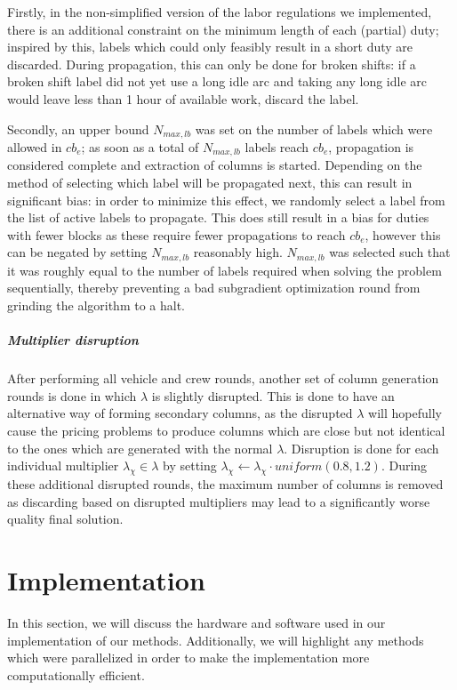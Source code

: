 \documentclass[]{article}
\begin{document}
Firstly, in the non-simplified version of the labor regulations we implemented, there is an additional constraint on the minimum length of each (partial) duty; inspired by this, labels which could only feasibly result in a short duty are discarded. During propagation, this can only be done for broken shifts: if a broken shift label did not yet use a long idle arc and taking any long idle arc would leave less than 1 hour of available work, discard the label.

Secondly, an upper bound $N_{max,lb}$ was set on the number of labels which were allowed in $cb_e$; as soon as a total of $N_{max,lb}$ labels reach $cb_e$, propagation is considered complete and extraction of columns is started. Depending on the method of selecting which label will be propagated next, this can result in significant bias: in order to minimize this effect, we randomly select a label from the list of active labels to propagate. This does still result in a bias for duties with fewer blocks as these require fewer propagations to reach $cb_e$, however this can be negated by setting $N_{max,lb}$ reasonably high. $N_{max,lb}$ was selected such that it was roughly equal to the number of labels required when solving the problem sequentially, thereby preventing a bad subgradient optimization round from grinding the algorithm to a halt.

\subparagraph{Multiplier disruption} After performing all vehicle and crew rounds, another set of column generation rounds is done in which $\lambda$ is slightly disrupted. This is done to have an alternative way of forming secondary columns, as the disrupted $\lambda$ will hopefully cause the pricing problems to produce columns which are close but not identical to the ones which are generated with the normal $\lambda$. Disruption is done for each individual multiplier $\lambda_\chi \in \lambda$ by setting $\lambda_\chi \gets \lambda_\chi \cdot \textit{uniform}(0.8,1.2)$. During these additional disrupted rounds, the maximum number of columns is removed as discarding based on disrupted multipliers may lead to a significantly worse quality final solution. 

\section{Implementation}
In this section, we will discuss the hardware and software used in our implementation of our methods. Additionally, we will highlight any methods which were parallelized in order to make the implementation more computationally efficient. 
\end{document}

